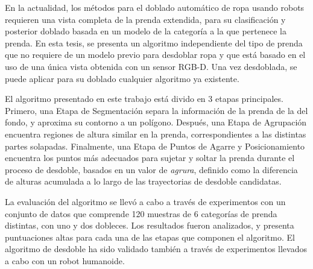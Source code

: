 En la actualidad, los métodos para el doblado automático de ropa usando robots requieren una vista completa de la prenda extendida, para su clasificación y posterior doblado basada en un modelo de la categoría a la que pertenece la prenda. En esta tesis, se presenta un algoritmo independiente del tipo de prenda que no requiere de un modelo previo para desdoblar ropa y que está basado en el uso de una única vista obtenida con un sensor RGB-D. Una vez desdoblada, se puede aplicar para su doblado cualquier algoritmo ya existente.

El algoritmo presentado en este trabajo está divido en 3 etapas principales. Primero, una Etapa de Segmentación separa la información de la prenda de la del fondo, y aproxima su contorno a un polígono. Después, una Etapa de Agrupación encuentra regiones de altura similar en la prenda, correspondientes a las distintas partes solapadas. Finalmente, una Etapa de Puntos de Agarre y Posicionamiento encuentra los puntos más adecuados para sujetar y soltar la prenda durante el proceso de desdoble, basados en un valor de \textit{agrura}, definido como la diferencia de alturas acumulada a lo largo de las trayectorias de desdoble candidatas.

La evaluación del algoritmo se llevó a cabo a través de experimentos con un conjunto de datos que comprende 120 muestras de 6 categorías de prenda distintas, con uno y dos dobleces. Los resultados fueron analizados, y presenta puntuaciones altas para cada una de las etapas que componen el algoritmo. El algoritmo de desdoble ha sido validado también a través de experimentos llevados a cabo con un robot humanoide.
